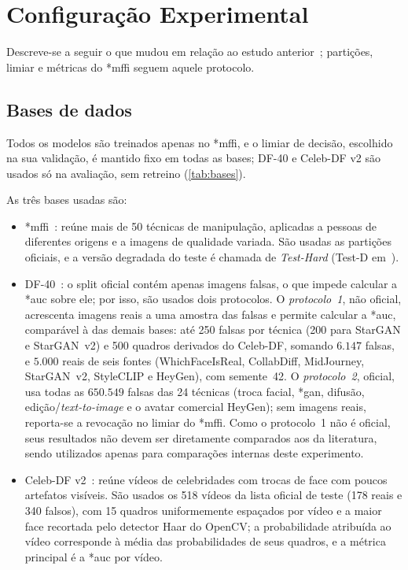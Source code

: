 \documentclass[10pt,conference]{IEEEtran}
\makeatletter
\newcommand{\acr@use}[2]{%
  \@ifundefined{acr@short@#1}{\textbf{??#1??}}{%
    \@ifundefined{acr@used@#1}{%
      \ifnum#2=0 \csname acr@long@#1\endcsname\else\csname acr@longpl@#1\endcsname\fi
      ~(\csname acr@short@#1\endcsname\ifnum#2=1 s\fi)%
      \expandafter\gdef\csname acr@used@#1\endcsname{}%
    }{%
      \csname acr@short@#1\endcsname\ifnum#2=1 s\fi
    }}%
}
\DeclareRobustCommand{\gls}{\@ifstar{\acr@use@s}{\acr@use@s}}
\newcommand{\acr@use@s}[1]{\acr@use{#1}{0}}
\makeatother
\begin{document}
\section{Configuração Experimental}
\label{sec:setup}

Descreve-se a seguir o que mudou em relação ao estudo anterior~\cite{cunha2026benchmarking}; partições, limiar e métricas do \gls*{mffi} seguem aquele protocolo.

\subsection{Bases de dados}
Todos os modelos são treinados apenas no \gls*{mffi}, e o limiar de decisão, escolhido na sua validação, é mantido fixo em todas as bases; DF-40 e Celeb-DF v2 são usados só na avaliação, sem retreino (\cref{tab:bases}).

As três bases usadas são:
\begin{itemize}
    \item \gls*{mffi}~\cite{ref_mffi}: reúne mais de 50 técnicas de manipulação, aplicadas a pessoas de diferentes origens e a imagens de qualidade variada. São usadas as partições oficiais, e a versão degradada do teste é chamada de \emph{Test-Hard} (Test-D em~\cite{ref_mffi}).
    \item DF-40~\cite{yan2024df40}: o split oficial contém apenas imagens falsas, o que impede calcular a \gls*{auc} sobre ele; por isso, são usados dois protocolos. O \textit{protocolo~1}, não oficial, acrescenta imagens reais a uma amostra das falsas e permite calcular a \gls*{auc}, comparável à das demais bases: até 250 falsas por técnica (200 para StarGAN e StarGAN~v2) e 500 quadros derivados do Celeb-DF, somando $6.147$ falsas, e $5.000$ reais de seis fontes (WhichFaceIsReal, CollabDiff, MidJourney, StarGAN~v2, StyleCLIP e HeyGen), com semente~42. O \textit{protocolo~2}, oficial, usa todas as $650.549$ falsas das 24 técnicas (troca facial, \gls*{gan}, difusão, edição/\textit{text-to-image} e o avatar comercial HeyGen); sem imagens reais, reporta-se a revocação no limiar do \gls*{mffi}. Como o protocolo~1 não é oficial, seus resultados não devem ser diretamente comparados aos da literatura, sendo utilizados apenas para comparações internas deste experimento.
    \item Celeb-DF v2~\cite{li2020celeb}: reúne vídeos de celebridades com trocas de face com poucos artefatos visíveis. São usados os 518 vídeos da lista oficial de teste (178 reais e 340 falsos), com 15 quadros uniformemente espaçados por vídeo e a maior face recortada pelo detector Haar do OpenCV; a probabilidade atribuída ao vídeo corresponde à média das probabilidades de seus quadros, e a métrica principal é a \gls*{auc} por vídeo.
\end{itemize}
\end{document}
